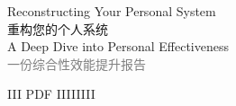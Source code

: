 \documentclass[a4paper,12pt]{article}
\title{\vspace{-2cm}}
\author{}
\date{}
\begin{document}
\begin{center}
    \fontsize{25pt}{30pt}\selectfont  Reconstructing Your Personal System\\
    \fontsize{20pt}{25pt}\selectfont  重构您的个人系统\textbar \\
    \fontsize{12pt}{15pt}\selectfont A Deep Dive into Personal Effectiveness\\
    \fontsize{12pt}{15pt}\selectfont\textcolor{gray}{一份综合性效能提升报告}
\end{center}

\begin{multicols}{2}
    \thispagestyle{firstpage}
    \onehalfspacing

    III PDF IIIIIIII

\end{multicols}
\end{document}

